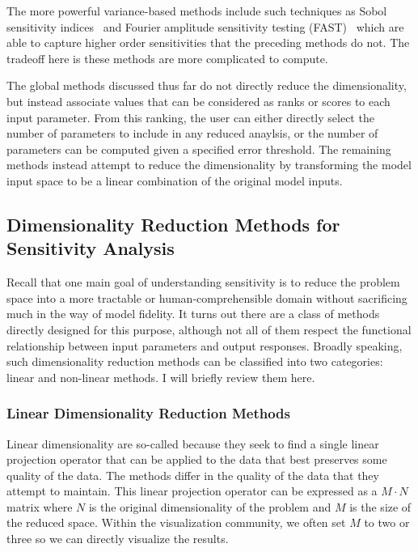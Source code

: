 The more powerful variance-based methods include such techniques as Sobol sensitivity indices~\cite{Sobol1993} and Fourier amplitude sensitivity testing (FAST)~\cite{CukierFortuinShuler1973} which are able to capture higher order sensitivities that the preceding methods do not.
%
The tradeoff here is these methods are more complicated to compute.

The global methods discussed thus far do not directly reduce the dimensionality, but instead associate values that can be considered as ranks or scores to each input parameter.
%
From this ranking, the user can either directly select the number of parameters to include in any reduced anaylsis, or the number of parameters can be computed given a specified error threshold.
%
The remaining methods instead attempt to reduce the dimensionality by transforming the model input space to be a linear combination of the original model inputs.
%

\subsection{Dimensionality Reduction Methods for Sensitivity Analysis}

Recall that one main goal of understanding sensitivity is to reduce the problem space into a more tractable or human-comprehensible domain without sacrificing much in the way of model fidelity.
%
It turns out there are a class of methods directly designed for this purpose, although not all of them respect the functional relationship between input parameters and output responses.
%
Broadly speaking, such dimensionality reduction methods can be classified into two categories: linear and non-linear methods.
%
I will briefly review them here.

\subsubsection{Linear Dimensionality Reduction Methods}

Linear dimensionality are so-called because they seek to find a single linear projection operator that can be applied to the data that best preserves some quality of the data.
%
The methods differ in the quality of the data that they attempt to maintain.
%
This linear projection operator can be expressed as a $M \cdot N$ matrix where $N$ is the original dimensionality of the problem and $M$ is the size of the reduced space.
%
Within the visualization community, we often set $M$ to two or three so we can directly visualize the results.

